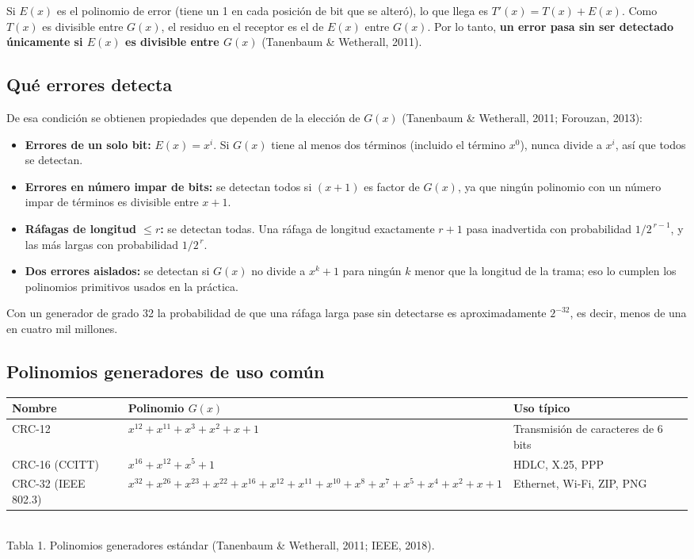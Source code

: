\documentclass[12pt,letterpaper]{article}
\begin{document}
Si $E(x)$ es el polinomio de error (tiene un 1 en cada posición de bit que se alteró), lo que llega es $T'(x) = T(x) + E(x)$. Como $T(x)$ es divisible entre $G(x)$, el residuo en el receptor es el de $E(x)$ entre $G(x)$. Por lo tanto, \textbf{un error pasa sin ser detectado únicamente si $E(x)$ es divisible entre $G(x)$} (Tanenbaum \& Wetherall, 2011).

\subsection{Qué errores detecta}
De esa condición se obtienen propiedades que dependen de la elección de $G(x)$ (Tanenbaum \& Wetherall, 2011; Forouzan, 2013):
\begin{itemize}[itemsep=2pt]
\item \textbf{Errores de un solo bit:} $E(x) = x^i$. Si $G(x)$ tiene al menos dos términos (incluido el término $x^0$), nunca divide a $x^i$, así que todos se detectan.
\item \textbf{Errores en número impar de bits:} se detectan todos si $(x+1)$ es factor de $G(x)$, ya que ningún polinomio con un número impar de términos es divisible entre $x+1$.
\item \textbf{Ráfagas de longitud $\le r$:} se detectan todas. Una ráfaga de longitud exactamente $r+1$ pasa inadvertida con probabilidad $1/2^{\,r-1}$, y las más largas con probabilidad $1/2^{\,r}$.
\item \textbf{Dos errores aislados:} se detectan si $G(x)$ no divide a $x^k + 1$ para ningún $k$ menor que la longitud de la trama; eso lo cumplen los polinomios primitivos usados en la práctica.
\end{itemize}
Con un generador de grado 32 la probabilidad de que una ráfaga larga pase sin detectarse es aproximadamente $2^{-32}$, es decir, menos de una en cuatro mil millones.

\subsection{Polinomios generadores de uso común}
\begin{center}
\small
\begin{tabular}{|>{\raggedright\arraybackslash}p{2.8cm}|>{\raggedright\arraybackslash}p{6.6cm}|>{\raggedright\arraybackslash}p{3.4cm}|}
\hline
\textbf{Nombre} & \textbf{Polinomio $G(x)$} & \textbf{Uso típico}\\
\hline
CRC-12 & $x^{12}+x^{11}+x^3+x^2+x+1$ & Transmisión de caracteres de 6 bits\\
\hline
CRC-16 (CCITT) & $x^{16}+x^{12}+x^5+1$ & HDLC, X.25, PPP\\
\hline
CRC-32 (IEEE 802.3) & $x^{32}+x^{26}+x^{23}+x^{22}+x^{16}+x^{12}+x^{11}+x^{10}+x^8+x^7+x^5+x^4+x^2+x+1$ & Ethernet, Wi-Fi, ZIP, PNG\\
\hline
\end{tabular}\\[3pt]
{\footnotesize Tabla 1. Polinomios generadores estándar (Tanenbaum \& Wetherall, 2011; IEEE, 2018).}
\end{center}
\end{document}
